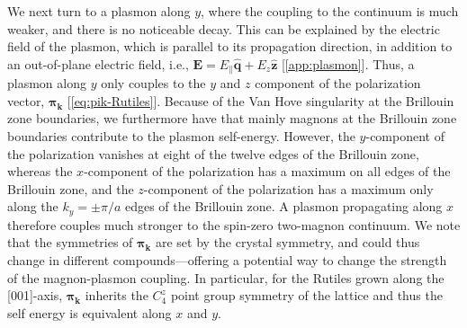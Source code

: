 \documentclass[aps,prb,reprint,twocolumns,superscriptaddress,nofootinbib]{revtex4-2}
\begin{document}
	We next turn to a plasmon along ${y}$, where the coupling to the continuum is much weaker, and there is no noticeable decay. 
	This can be explained by the electric field of the plasmon, which is parallel to its propagation direction, in addition to an out-of-plane electric field, i.e., $\bm E =  E_{\parallel}\hat{\bm q} + E_z \hat{\bm z}$ [\cref{app:plasmon}]. Thus, a plasmon along ${y}$ only couples to the $y$ and $z$ component of the polarization vector, $\bm\pi_{\bm k}$ [\cref{eq:pik-Rutiles}]. Because of the Van Hove singularity at the Brillouin zone boundaries, we furthermore have that mainly magnons at the Brillouin zone boundaries contribute to the plasmon self-energy. However, the $y$-component of the polarization vanishes at eight of the twelve edges of the Brillouin zone, whereas the $x$-component of the polarization has a maximum on all edges of the Brillouin zone, and the $z$-component of the polarization has a maximum only along the $k_y=\pm \pi/a$ edges of the Brillouin zone. A plasmon propagating along $x$ therefore couples much stronger to the spin-zero two-magnon continuum. We note that the symmetries of $\bm\pi_{\bm k}$ are set by the crystal symmetry, and could thus change in different compounds---offering a potential way to change the strength of the magnon-plasmon coupling. In particular, for the Rutiles grown along the [001]-axis, $\bm\pi_{\bm k}$ inherits the $C_4^z$ point group symmetry of the lattice and thus the self energy is equivalent along $x$ and $y$.
	
\end{document}
